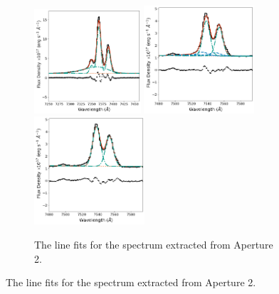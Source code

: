 \begin{figure}
\begin{subfigure}[t]{0.9\linewidth}
        \hspace{1.42cm}
        \includegraphics[width=0.435\textwidth]{figures/muse_f13451_1232/line_fits/ap2_halpha_no_nuclear_model.png}
        \vfill
        \includegraphics[width=0.45\textwidth]{figures/muse_f13451_1232/line_fits/ap2_sii.png}
        \hspace{1.3cm}
        \includegraphics[width=0.45\textwidth]{figures/muse_f13451_1232/line_fits/ap2_sii_no_nuclear_model.png}
        \label{fig: muse_f13451_1232: analysis_and_results: extended_emission: ap2_line_fits}
        \caption{The line fits for the spectrum extracted from Aperture 2.}
    \end{subfigure}
\end{figure}
